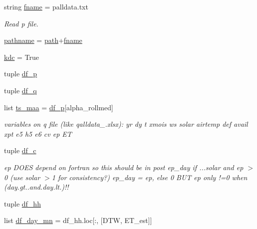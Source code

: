 \begin{DoxyCompactItemize}
string \hyperlink{namespaces__post__process_01-_01_comments_a755936030fef486b5e163765fe6030b8}{fname} = \textquotesingle{}palldata.\+txt\textquotesingle{}
\begin{DoxyCompactList}\small\item\em Read p file. \end{DoxyCompactList}\item 
\hyperlink{namespaces__post__process_01-_01_comments_a44e382ad617792a5ed02be95da593433}{pathname} = \hyperlink{namespaces__post__process_01-_01_comments_a443ac998e99f88439a5522c68a86609f}{path}+\hyperlink{namespaces__post__process_01-_01_comments_a755936030fef486b5e163765fe6030b8}{fname}
\item 
\hyperlink{namespaces__post__process_01-_01_comments_a9ad05e10331e51befb7fbd20adefb30e}{kdc} = True
\item 
tuple \hyperlink{namespaces__post__process_01-_01_comments_a043c82fbb0106ffd9805f3c107892cf5}{df\+\_\+p}
\item 
tuple \hyperlink{namespaces__post__process_01-_01_comments_ac48c9e765f3ad2bfb2f1dd1af5b16598}{df\+\_\+q}
\item 
list \hyperlink{namespaces__post__process_01-_01_comments_a5cad3f0b3385326f66c3ea7402ac4b4b}{ts\+\_\+maa} = \hyperlink{namespaces__post__process_01-_01_comments_a043c82fbb0106ffd9805f3c107892cf5}{df\+\_\+p}\mbox{[}\textquotesingle{}alpha\+\_\+rollmed\textquotesingle{}\mbox{]}
\begin{DoxyCompactList}\small\item\em variables on q file (like qalldata\+\_.\+xlsx)\+: yr dy t xmois ws solar airtemp def avail xpt e5 h5 e6 cv ep E\+T \end{DoxyCompactList}\item 
tuple \hyperlink{namespaces__post__process_01-_01_comments_a816aaeb2a13f356b17e012a7e77253a7}{df\+\_\+c}
\begin{DoxyCompactList}\small\item\em ep D\+O\+E\+S depend on fortran so this should be in post ep\+\_\+day if ...solar and ep $>$ 0 (use solar $>$1 for consistency?) ep\+\_\+day = ep, else 0 B\+U\+T ep only !=0 when (day.\+gt..\+and.\+day.\+lt.)!! \end{DoxyCompactList}\item 
tuple \hyperlink{namespaces__post__process_01-_01_comments_a799dd3cc5b8e24283cbce5d20d97168b}{df\+\_\+hh}
\item 
list \hyperlink{namespaces__post__process_01-_01_comments_a1b2d87778a264a8cbd089338b879c0ad}{df\+\_\+day\+\_\+mn} = df\+\_\+hh.\+loc\mbox{[}\+:, \mbox{[}\textquotesingle{}D\+T\+W\textquotesingle{}, \textquotesingle{}E\+T\+\_\+est\textquotesingle{}\mbox{]}\mbox{]}

\end{DoxyCompactItemize}
